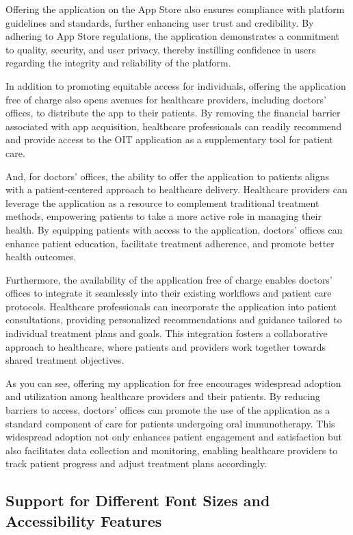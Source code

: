 Offering the application on the App Store also ensures compliance with platform guidelines and standards, further enhancing user trust and credibility. By adhering to App Store regulations, the application demonstrates a commitment to quality, security, and user privacy, thereby instilling confidence in users regarding the integrity and reliability of the platform.

In addition to promoting equitable access for individuals, offering the application free of charge also opens avenues for healthcare providers, including doctors' offices, to distribute the app to their patients. By removing the financial barrier associated with app acquisition, healthcare professionals can readily recommend and provide access to the OIT application as a supplementary tool for patient care.

And, for doctors' offices, the ability to offer the application to patients aligns with a patient-centered approach to healthcare delivery. Healthcare providers can leverage the application as a resource to complement traditional treatment methods, empowering patients to take a more active role in managing their health. By equipping patients with access to the application, doctors' offices can enhance patient education, facilitate treatment adherence, and promote better health outcomes.

Furthermore, the availability of the application free of charge enables doctors' offices to integrate it seamlessly into their existing workflows and patient care protocols. Healthcare professionals can incorporate the application into patient consultations, providing personalized recommendations and guidance tailored to individual treatment plans and goals. This integration fosters a collaborative approach to healthcare, where patients and providers work together towards shared treatment objectives.

As you can see, offering my application for free encourages widespread adoption and utilization among healthcare providers and their patients. By reducing barriers to access, doctors' offices can promote the use of the application as a standard component of care for patients undergoing oral immunotherapy. This widespread adoption not only enhances patient engagement and satisfaction but also facilitates data collection and monitoring, enabling healthcare providers to track patient progress and adjust treatment plans accordingly.

\subsection{Support for Different Font Sizes and Accessibility Features}

